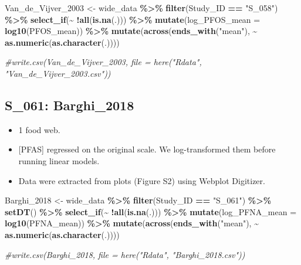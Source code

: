 \documentclass[
]{article}
\newenvironment{Shaded}{\begin{snugshade}}{\end{snugshade}}
\newcommand{\AttributeTok}[1]{\textcolor[rgb]{0.13,0.29,0.53}{#1}}
\newcommand{\CommentTok}[1]{\textcolor[rgb]{0.56,0.35,0.01}{\textit{#1}}}
\newcommand{\FunctionTok}[1]{\textcolor[rgb]{0.13,0.29,0.53}{\textbf{#1}}}
\newcommand{\NormalTok}[1]{#1}
\newcommand{\OtherTok}[1]{\textcolor[rgb]{0.56,0.35,0.01}{#1}}
\newcommand{\SpecialCharTok}[1]{\textcolor[rgb]{0.81,0.36,0.00}{\textbf{#1}}}
\newcommand{\StringTok}[1]{\textcolor[rgb]{0.31,0.60,0.02}{#1}}
\providecommand{\tightlist}{%
  \setlength{\itemsep}{0pt}\setlength{\parskip}{0pt}}
\begin{document}
\begin{Shaded}
\begin{Highlighting}[]
\NormalTok{Van\_de\_Vijver\_2003 }\OtherTok{\textless{}{-}}\NormalTok{ wide\_data }\SpecialCharTok{\%\textgreater{}\%} 
  \FunctionTok{filter}\NormalTok{(Study\_ID }\SpecialCharTok{==} \StringTok{"S\_058"}\NormalTok{) }\SpecialCharTok{\%\textgreater{}\%}
  \FunctionTok{select\_if}\NormalTok{(}\SpecialCharTok{\textasciitilde{}} \SpecialCharTok{!}\FunctionTok{all}\NormalTok{(}\FunctionTok{is.na}\NormalTok{(.))) }\SpecialCharTok{\%\textgreater{}\%}
  \FunctionTok{mutate}\NormalTok{(}\AttributeTok{log\_PFOS\_mean =} \FunctionTok{log10}\NormalTok{(PFOS\_mean)) }\SpecialCharTok{\%\textgreater{}\%} 
  \FunctionTok{mutate}\NormalTok{(}\FunctionTok{across}\NormalTok{(}\FunctionTok{ends\_with}\NormalTok{(}\StringTok{"mean"}\NormalTok{), }\SpecialCharTok{\textasciitilde{}} \FunctionTok{as.numeric}\NormalTok{(}\FunctionTok{as.character}\NormalTok{(.))))}

\CommentTok{\#write.csv(Van\_de\_Vijver\_2003, file = here("Rdata", "Van\_de\_Vijver\_2003.csv"))}
\end{Highlighting}
\end{Shaded}

\subsection{S\_061: Barghi\_2018}\label{s_061-barghi_2018}

\begin{itemize}
\tightlist
\item
  1 food web.
\item
  {[}PFAS{]} regressed on the original scale. We log-transformed them
  before running linear models.
\item
  Data were extracted from plots (Figure S2) using Webplot Digitizer.
\end{itemize}

\begin{Shaded}
\begin{Highlighting}[]
\NormalTok{Barghi\_2018 }\OtherTok{\textless{}{-}}\NormalTok{ wide\_data }\SpecialCharTok{\%\textgreater{}\%} 
  \FunctionTok{filter}\NormalTok{(Study\_ID }\SpecialCharTok{==} \StringTok{"S\_061"}\NormalTok{) }\SpecialCharTok{\%\textgreater{}\%} 
  \FunctionTok{setDT}\NormalTok{() }\SpecialCharTok{\%\textgreater{}\%}
  \FunctionTok{select\_if}\NormalTok{(}\SpecialCharTok{\textasciitilde{}} \SpecialCharTok{!}\FunctionTok{all}\NormalTok{(}\FunctionTok{is.na}\NormalTok{(.))) }\SpecialCharTok{\%\textgreater{}\%}
  \FunctionTok{mutate}\NormalTok{(}\AttributeTok{log\_PFNA\_mean =} \FunctionTok{log10}\NormalTok{(PFNA\_mean)) }\SpecialCharTok{\%\textgreater{}\%} 
  \FunctionTok{mutate}\NormalTok{(}\FunctionTok{across}\NormalTok{(}\FunctionTok{ends\_with}\NormalTok{(}\StringTok{"mean"}\NormalTok{), }\SpecialCharTok{\textasciitilde{}} \FunctionTok{as.numeric}\NormalTok{(}\FunctionTok{as.character}\NormalTok{(.))))}

\CommentTok{\#write.csv(Barghi\_2018, file = here("Rdata", "Barghi\_2018.csv"))}
\end{Highlighting}
\end{Shaded}
\end{document}
